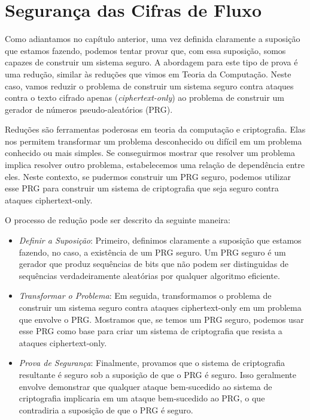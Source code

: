 \section{Segurança das Cifras de Fluxo}
\label{sec:streamcipher-sec}

Como adiantamos no capítulo anterior, uma vez definida claramente a suposição que estamos fazendo, podemos tentar provar que, com essa suposição, somos capazes de construir um sistema seguro.
A abordagem para este tipo de prova é uma redução, similar às reduções que vimos em Teoria da Computação.
Neste caso, vamos reduzir o problema de construir um sistema seguro contra ataques contra o texto cifrado apenas ({\em ciphertext-only}) ao problema de construir um gerador de números pseudo-aleatórios (PRG).

Reduções são ferramentas poderosas em teoria da computação e criptografia.
Elas nos permitem transformar um problema desconhecido ou difícil em um problema conhecido ou mais simples.
Se conseguirmos mostrar que resolver um problema implica resolver outro problema, estabelecemos uma relação de dependência entre eles.
Neste contexto, se pudermos construir um PRG seguro, podemos utilizar esse PRG para construir um sistema de criptografia que seja seguro contra ataques ciphertext-only.

O processo de redução pode ser descrito da seguinte maneira:

\begin{itemize}
\item {\em Definir a Suposição}:
  Primeiro, definimos claramente a suposição que estamos fazendo, no caso, a existência de um PRG seguro.
  Um PRG seguro é um gerador que produz sequências de bits que não podem ser distinguidas de sequências verdadeiramente aleatórias por qualquer algoritmo eficiente.

\item {\em Transformar o Problema}:
  Em seguida, transformamos o problema de construir um sistema seguro contra ataques ciphertext-only em um problema que envolve o PRG.
  Mostramos que, se temos um PRG seguro, podemos usar esse PRG como base para criar um sistema de criptografia que resista a ataques ciphertext-only.

\item {\em Prova de Segurança}:
  Finalmente, provamos que o sistema de criptografia resultante é seguro sob a suposição de que o PRG é seguro.
  Isso geralmente envolve demonstrar que qualquer ataque bem-sucedido ao sistema de criptografia implicaria em um ataque bem-sucedido ao PRG, o que contradiria a suposição de que o PRG é seguro.
\end{itemize}

